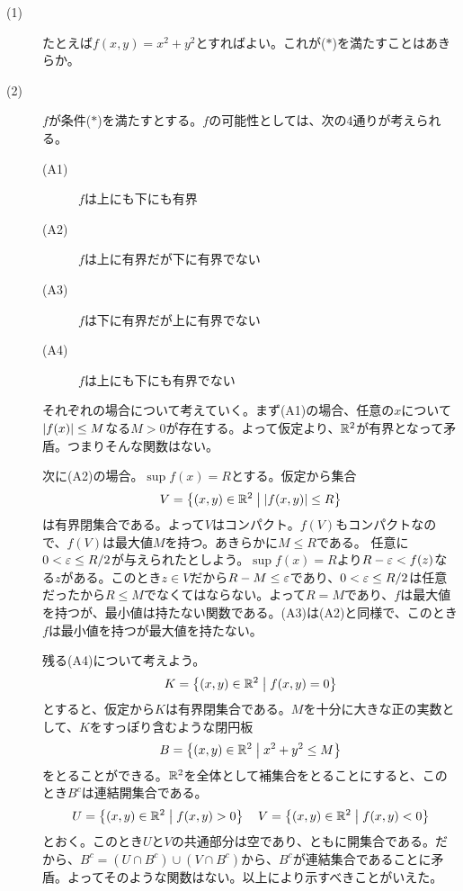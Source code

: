 \begin{sol} ${}$
  \begin{description}
    \item[(1)] たとえば$f(x,y) = x^2 + y^2$とすればよい。これが($*$)を満たすことはあきらか。
    \item[(2)] $f$が条件($*$)を満たすとする。$f$の可能性としては、次の4通りが考えられる。
\begin{description}
  \item[(A1)] $f$は上にも下にも有界
  \item[(A2)] $f$は上に有界だが下に有界でない
  \item[(A3)] $f$は下に有界だが上に有界でない
  \item[(A4)] $f$は上にも下にも有界でない
\end{description}
    それぞれの場合について考えていく。まず(A1)の場合、任意の$x$について$\left \lvert f(x) \right \rvert \leq M$なる$M > 0$が存在する。よって仮定より、${\mathbb R}^2$が有界となって矛盾。つまりそんな関数はない。

    次に(A2)の場合。$\sup f(x) = R$とする。仮定から集合
    \[
    V = \left\{ (x,y) \in {\mathbb R}^2 \mathrel{} \middle| \mathrel{}  \left \lvert f(x,y) \right \rvert \leq R  \right\}
    \]
    は有界閉集合である。よって$V$はコンパクト。$f(V)$もコンパクトなので、$f(V)$は最大値$M$を持つ。あきらかに$M \leq R$である。
    任意に$0 < {\varepsilon} \leq R/2$が与えられたとしよう。$\sup f(x) = R$より$R-{\varepsilon} < f(z)$なる$z$がある。このとき$z \in V$だから$R - M \leq {\varepsilon}$であり、$0 < {\varepsilon} \leq R/2$は任意だったから$R \leq M$でなくてはならない。よって$R=M$であり、$f$は最大値を持つが、最小値は持たない関数である。(A3)は(A2)と同様で、このとき$f$は最小値を持つが最大値を持たない。

    残る(A4)について考えよう。
    \[
    K = \left\{ (x,y) \in {\mathbb R}^2 \mathrel{} \middle| \mathrel{} f(x,y)=0  \right\}
    \]
    とすると、仮定から$K$は有界閉集合である。$M$を十分に大きな正の実数として、$K$をすっぽり含むような閉円板
    \[
    B= \left\{ (x,y) \in {\mathbb R}^2 \mathrel{} \middle| \mathrel{}  x^2 + y^2 \leq M \right\}
    \]
    をとることができる。${\mathbb R}^2$を全体として補集合をとることにすると、このとき$B^c$は連結開集合である。
    \[
    U = \left\{ (x,y) \in {\mathbb R}^2 \mathrel{} \middle| \mathrel{} f(x,y) > 0 \right\} \quad V = \left\{ (x,y) \in {\mathbb R}^2 \mathrel{} \middle| \mathrel{} f(x,y) < 0 \right\}
    \]
    とおく。このとき$U$と$V$の共通部分は空であり、ともに開集合である。だから、$B^c = (U \cap B^c) \cup (V \cap B^c)$から、$B^c$が連結集合であることに矛盾。よってそのような関数はない。以上により示すべきことがいえた。
  \end{description}
\end{sol}


